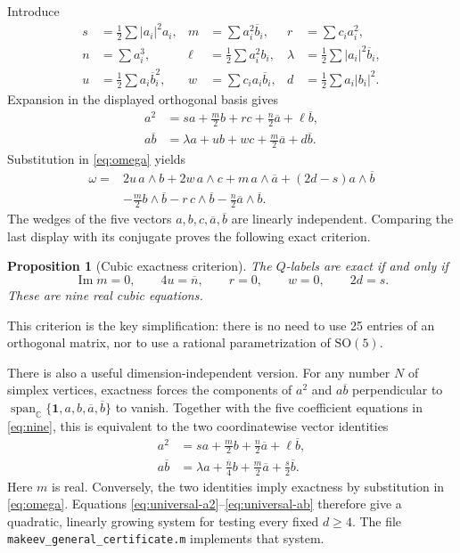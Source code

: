 \documentclass[11pt,reqno]{amsart}
\newtheorem{proposition}[theorem]{Proposition}
\theoremstyle{remark}
\newcommand{\C}{\mathbb C}
\newcommand{\one}{\mathbf 1}
\newcommand{\SO}{\mathrm{SO}}
\newcommand{\abs}[1]{\left\lvert #1\right\rvert}
\begin{document}
Introduce
\begin{align*}
 s&=\frac12\sum\abs{a_i}^2a_i,&
 m&=\sum a_i^2\overline b_i,&
 r&=\sum c_i a_i^2,\\
 n&=\sum a_i^3,&
 \ell&=\frac12\sum a_i^2b_i,&
 \lambda&=\frac12\sum\abs{a_i}^2\overline b_i,\\
 u&=\frac12\sum a_i\overline b_i^2,&
 w&=\sum c_i a_i\overline b_i,&
 d&=\frac12\sum a_i\abs{b_i}^2.
\end{align*}
Expansion in the displayed orthogonal basis gives
\begin{align*}
 a^2&=sa+\frac m2b+rc+\frac n2\overline a+\ell\overline b,\\
 a\overline b&=\lambda a+ub+wc+\frac m2\overline a+d\overline b.
\end{align*}
Substitution in \eqref{eq:omega} yields
\begin{align*}
 \omega={}&2u\,a\wedge b+2w\,a\wedge c+m\,a\wedge\overline a
 +(2d-s)a\wedge\overline b\\
 &-\frac m2b\wedge\overline b-r\,c\wedge\overline b
 -\frac n2\overline a\wedge\overline b.
\end{align*}
The wedges of the five vectors $a,b,c,\overline a,\overline b$ are linearly
independent.  Comparing the last display with its conjugate proves the
following exact criterion.

\begin{proposition}[Cubic exactness criterion]\label{prop:criterion}
The $Q$-labels are exact if and only if
\begin{equation}\label{eq:nine}
 \operatorname{Im}m=0,\qquad
 4u=\overline n,\qquad
 r=0,\qquad w=0,\qquad 2d=s.
\end{equation}
These are nine real cubic equations.
\end{proposition}

This criterion is the key simplification: there is no need to use 25 entries
of an orthogonal matrix, nor to use a rational parametrization of
$\SO(5)$.

There is also a useful dimension-independent version.  For any number $N$ of
simplex vertices, exactness forces the components of $a^2$ and
$a\overline b$ perpendicular to
$\operatorname{span}_{\C}\{\one,a,b,\overline a,\overline b\}$ to vanish.
Together with the five coefficient equations in
\eqref{eq:nine}, this is equivalent to the two coordinatewise vector
identities
\begin{align}
 a^2&=sa+\frac m2b+\frac n2\overline a+\ell\overline b,
 \label{eq:universal-a2}\\
 a\overline b&=\lambda a+\frac{\overline n}{4}b
 +\frac m2\overline a+\frac s2\overline b.
 \label{eq:universal-ab}
\end{align}
Here $m$ is real.  Conversely, the two identities imply exactness by
substitution in \eqref{eq:omega}.  Equations
\eqref{eq:universal-a2}--\eqref{eq:universal-ab} therefore give a
quadratic, linearly growing system for testing every fixed $d\ge4$.  The file
\texttt{makeev\_general\_certificate.m} implements that system.
\end{document}
